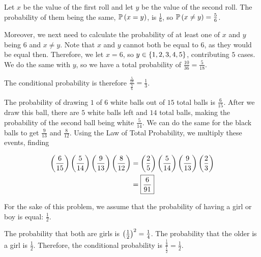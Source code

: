 \documentclass{article}
\begin{document}
 
\problem{}


Let $x$ be the value of the first roll and let $y$ be the value of the second roll.
The probability of them being the same, $\mathbb{P} \left ( x = y \right)$, is $\frac{1}{6}$, so $\mathbb{P} \left ( x \neq y \right) = \frac{5}{6}$.

Moreover, we next need to calculate the probability of at least one of $x$ and $y$ being 6 and $x \neq y$.
Note that $x$ and $y$ cannot both be equal to $6$, as they would be equal then.
Therefore, we let $x=6$, so $y \in \left \{ 1, 2, 3, 4, 5 \right \}$, contributing $5$ cases.
We do the same with $y$, so we have a total probability of $\frac{10}{36} = \frac{5}{18}$.

The conditional probability is therefore $\frac{\frac{5}{18}}{\frac{5}{6}} = \boxed{\frac{1}{3}}$.

\setcounter{problem}{4}
\problem{}

The probability of drawing $1$ of $6$ white balls out of $15$ total balls is $\frac{6}{15}$.
After we draw this ball, there are $5$ white balls left and $14$ total balls, making the probability of the second ball being white $\frac{5}{14}$.
We can do the same for the black balls to get $\frac{9}{13}$ and $\frac{8}{12}$.
Using the Law of Total Probability, we multiply these events, finding

\begin{align*}
  \left (\frac{6}{15} \right) \left (\frac{5}{14} \right) \left (\frac{9}{13} \right) \left (\frac{8}{12} \right) &= \left (\frac{2}{5} \right) \left (\frac{5}{14} \right) \left (\frac{9}{13} \right) \left (\frac{2}{3} \right) \\
                                                                                  &= \boxed{\frac{6}{91}}
\end{align*}

\setcounter{problem}{7}
\problem{}
For the sake of this problem, we assume that the probability of having a girl or boy is equal: $\frac{1}{2}$.

The probability that both are girls is $\left (\frac{1}{2} \right)^2 = \frac{1}{4}$.
The probability that the older is a girl is $\frac{1}{2}$.
Therefore, the conditional probability is $\frac{\frac{1}{4}}{\frac{1}{2}} = \boxed{\frac{1}{2}}$.

\setcounter{problem}{9}
\problem{}
\end{document}
